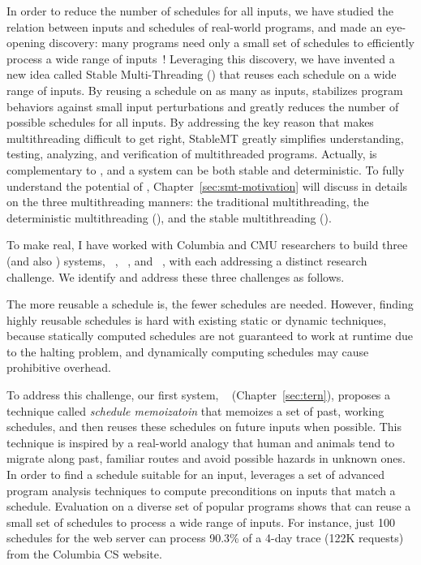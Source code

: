 In order to reduce the number of schedules for all inputs, we have studied the
relation between inputs and schedules of real-world programs, and made an
eye-opening discovery: many programs need only a small set of schedules to
efficiently process a wide range of inputs~\cite{smt:cacm}! Leveraging this
discovery, we have invented a new idea called Stable Multi-Threading (\smt)
that reuses each schedule on a wide range of inputs. By reusing a schedule on as
many as inputs, \smt stabilizes program behaviors against small input
perturbations and greatly reduces the number of possible schedules for all
inputs. By addressing the key reason that makes multithreading difficult to get
right, StableMT greatly simplifies understanding, testing, analyzing, and
verification of multithreaded programs. Actually, \smt is complementary to \dmt,
and a system can be both stable and deterministic. To fully understand the
potential of \smt, Chapter~\ref{sec:smt-motivation} will discuss in details on
the three multithreading manners: the traditional multithreading, the
deterministic multithreading (\dmt), and the stable multithreading (\smt).


To make \smt real, I have worked with Columbia and CMU researchers to build
three \smt (and also \dmt) systems, \tern~\cite{cui:tern:osdi10},
\peregrine~\cite{peregrine:sosp11}, and \parrot~\cite{parrot:sosp13}, with each
addressing a distinct research challenge. We identify and address these three
challenges as follows.

 The more reusable a schedule is, the fewer schedules are needed.
However, finding highly reusable schedules is hard with existing static or
dynamic techniques, because statically computed schedules are not guaranteed to
work at runtime due to the halting problem, and dynamically computing schedules
may cause prohibitive overhead.

To address this challenge, our first \smt system, \tern~\cite{cui:tern:osdi10}
(Chapter~\ref{sec:tern}), proposes a technique called \emph{schedule
memoizatoin} that memoizes a set of past, working schedules, and then reuses
these schedules on future inputs when possible. This technique is inspired by a
real-world analogy that human and animals tend to migrate along past, familiar
routes and avoid possible hazards in unknown ones. In order to find a schedule
suitable for an input, \tern leverages a set of advanced program analysis
techniques to compute preconditions on inputs that match a schedule. Evaluation
on a diverse set of popular programs shows that \tern can reuse a small set of
schedules to process a wide range of inputs. For instance, just 100 schedules
for the \apache web server can process 90.3\% of a 4-day trace (122K requests)
from the Columbia CS website.

